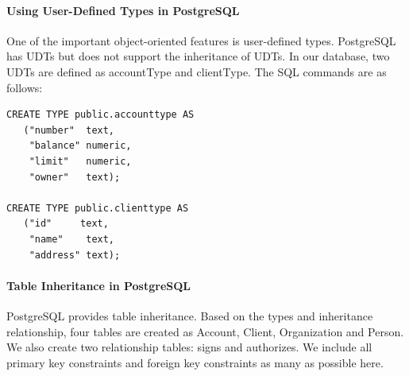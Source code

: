 \documentclass[11pt]{article}
\begin{document}
\paragraph{Using User-Defined Types in PostgreSQL}

\par
One of the important object-oriented features is user-defined types. PostgreSQL has UDTs but does not support the inheritance of UDTs. In our database, two UDTs are defined as accountType and clientType. The SQL commands are as follows:

\begin{verbatim}
CREATE TYPE public.accounttype AS
   ("number"  text,
    "balance" numeric,
    "limit"   numeric,
    "owner"   text);

CREATE TYPE public.clienttype AS
   ("id"     text,
    "name"    text,
    "address" text);
\end{verbatim}

\paragraph{Table Inheritance in PostgreSQL}
\par
PostgreSQL provides table inheritance. Based on the types and inheritance relationship, four tables are created as Account, Client, Organization and Person. We also create two relationship tables: signs and authorizes. We include all primary key constraints and foreign key constraints as many as possible here.
\end{document}
